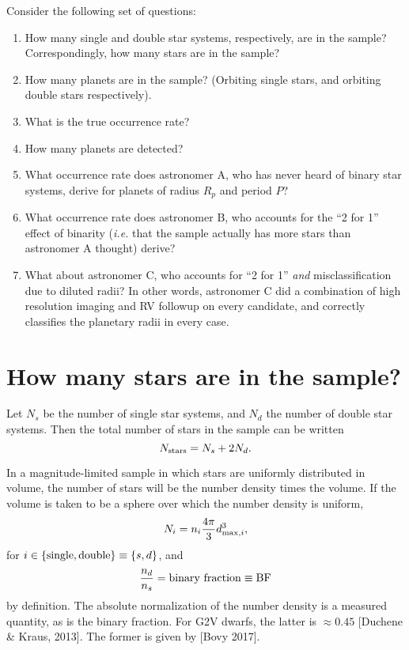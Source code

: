 \documentclass{emulateapj}
\begin{document}
Consider the following set of questions:
\begin{enumerate}
\item How many single and double star systems, respectively, are in the sample?
Correspondingly, how many stars are in the sample?

\item How many planets are in the sample? (Orbiting single stars, and orbiting 
double stars respectively).

\item What is the true occurrence rate?

\item How many planets are detected?

\item What occurrence rate does astronomer A, who has never heard of binary 
star systems, derive for planets of radius $R_p$ and period $P$?

\item What occurrence rate does astronomer B, who accounts for the ``2 for 1'' 
effect of binarity (\textit{i.e.} that the sample actually has more stars than 
astronomer A thought) derive?

\item What about astronomer C, who accounts for ``2 for 1'' \textit{and} 
misclassification due to diluted radii? In other words, astronomer C did a 
combination of high resolution imaging and RV followup on every candidate, and
correctly classifies the planetary radii in every case.
\end{enumerate}


\section{How many stars are in the sample?}

Let $N_s$ be the number of single star systems, and $N_d$ the number of double 
star systems. Then the total number of stars in the sample can be written
\begin{equation}
N_{\rm stars} = N_s + 2N_d.
\end{equation}

In a magnitude-limited sample in which stars are uniformly distributed in 
volume, the number of stars will be the number density times the volume.
If the volume is taken to be a sphere over which the number density is uniform,
\begin{equation}
N_i = n_{i} \frac{4\pi}{3} d_{{\rm max},i}^3,
\label{eq:number_systems}
\end{equation}
for $i\in{\rm \{single,double\} } \equiv { \{s,d\} }$, and
\begin{equation}
\frac{n_{d}}{n_{s}} = {\rm binary\ fraction} \equiv {\rm BF}
\end{equation}
by definition. The absolute normalization of the number density is a measured 
quantity, as is the binary fraction. For G2V dwarfs, the latter is $\approx 
0.45$ [Duchene \& Kraus, 2013]. The former is given by [Bovy 2017].
\end{document}
